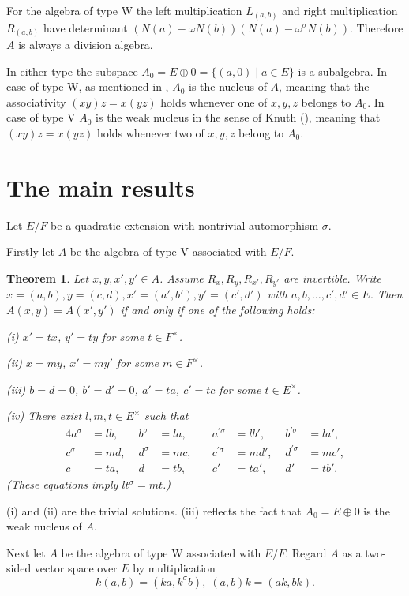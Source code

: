 \documentclass{article}
\newtheorem{thm}{Theorem}[section]
\begin{document}
For the algebra of type W
the left multiplication $L_{(a,b)}$ and right multiplication $R_{(a,b)}$ have determinant
$(N(a)-\omega N(b))(N(a)-\omega^{\sigma}N(b))$.
Therefore $A$ is always a division algebra.


In either type  
the subspace $A_0=E\oplus 0=\{(a,0)\mid a\in E\}$ is a subalgebra.
In case of type W, as mentioned in \cite{Knu},  $A_0$ is the nucleus of $A$, meaning that the associativity
$(xy)z=x(yz)$ holds whenever one of $x,y,z$ belongs to $A_0$.
In case of type V $A_0$ is the weak nucleus in the sense of Knuth (\cite{Knu}), meaning that
$(xy)z=x(yz)$ holds whenever two of $x,y,z$ belong to $A_0$.


\section{The main results}

Let $E/F$ be a quadratic extension with nontrivial automorphism $\sigma$.

Firstly let $A$ be the algebra of type V associated with $E/F$.

\begin{thm}
Let $x,y,x',y'\in A$.
Assume $R_{x},R_{y},R_{x'},R_{y'}$ are invertible.
Write $x=(a,b), y=(c,d), x'=(a',b'),y'=(c',d')$ with $a,b,\dots,c',d'\in E$.
Then  $A(x,y)=A(x',y')$ if and only if one of the following holds:


(i) $x'=tx$, $y'=ty$ for some $t\in F^{\times}$.

(ii) $x=my$, $x'=my'$ for some $m\in F^{\times}$.

(iii) $b=d=0$, $b'=d'=0$, $a'=ta$, $c'=tc$ for some $t\in E^{\times}$.

(iv) There exist $l,m, t\in E^{\times}$ such that
\begin{alignat*}{4}
a^{\sigma}&=l b, \quad& b^{\sigma}&=l a, \quad&
a^{\prime\sigma}&=l b',\quad& b^{\prime\sigma}&=l a',\\
c^{\sigma}&=m d, & d^{\sigma}&= mc, \quad&
c^{\prime\sigma}&=m d', & d^{\prime\sigma}&=m c',\\
c&=t a, & d&=t b, \quad&
c' &=t a', & d'&=t b'.
\end{alignat*}
(These equations imply 
$lt^{\sigma}=m t$.)
\end{thm}

(i) and (ii) are the trivial solutions.
(iii) reflects the fact that $A_0=E\oplus 0$ is the weak nucleus of $A$.


Next let $A$ be the algebra of type W associated with  $E/F$.
Regard $A$ as a two-sided vector space over  $E$ by multiplication
$$
k(a,b)=(ka,k^{\sigma}b), \; (a,b)k=(ak,bk).
$$
\end{document}
